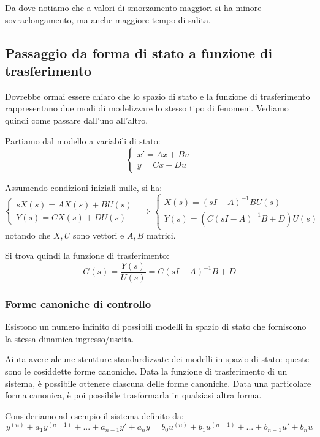 \documentclass[a4paper,11pt]{article}
\begin{document}
\par\bigskip

Da dove notiamo che a valori di smorzamento maggiori si ha minore sovraelongamento, ma anche maggiore tempo di salita.

\subsection{Passaggio da forma di stato a funzione di trasferimento}
Dovrebbe ormai essere chiaro che lo spazio di stato e la funzione di trasferimento rappresentano due modi di modelizzare lo stesso tipo di fenomeni.
Vediamo quindi come passare dall'uno all'altro.

Partiamo dal modello a variabili di stato:
\[
	\begin{cases}
		x' = Ax + Bu \\
		y = Cx + Du
	\end{cases}
\]

Assumendo condizioni iniziali nulle, si ha:
\[
	\begin{cases}
		s X(s) = A X(s) + B U(s)  \\ 
		Y(s) = C X(s) + D U(s) 
	\end{cases} \implies
	\begin{cases}
		X(s) = (sI - A)^{-1} B U(s) \\
		Y(s) = \left( C(sI - A)^{-1} B + D \right) U(s)
	\end{cases}
\]
notando che $X, U$ sono vettori e $A, B$ matrici.

Si trova quindi la funzione di trasferimento:
$$
G(s) = \frac{Y(s)}{U(s)} = C(sI - A)^{-1} B + D
$$

\subsubsection{Forme canoniche di controllo}
Esistono un numero infinito di possibili modelli in spazio di stato che forniscono la stessa dinamica ingresso/uscita.

Aiuta avere alcune strutture standardizzate dei modelli in spazio di stato: queste sono le cosiddette forme canoniche.
Data la funzione di trasferimento di un sistema, è possibile ottenere ciascuna delle forme canoniche.
Data una particolare forma canonica, è poi possibile trasformarla in qualsiasi altra forma.

Consideriamo ad esempio il sistema definito da:
$$
y^{(n)} + a_1 y^{(n - 1)} + ... + a_{n - 1}y' + a_n y = b_0 u^{(n)} + b_1 u^{(n - 1)} + ... + b_{n - 1} u' + b_nu
$$
\end{document}
